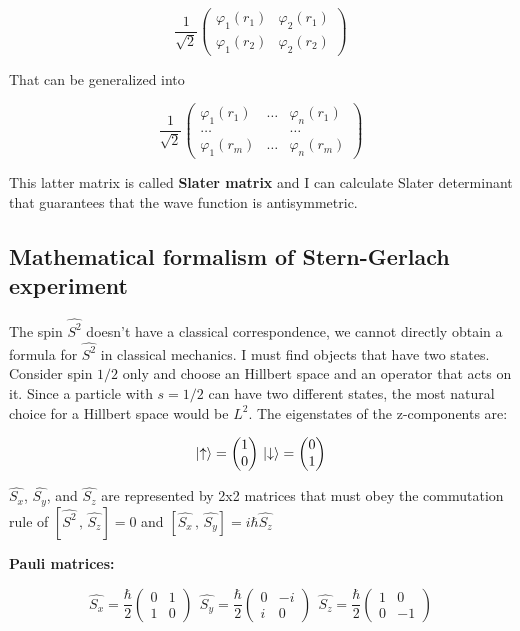 	$$\frac{1}{\sqrt{2}}\begin{pmatrix}\varphi_1(r_1)&\varphi_2(r_1)\\\varphi_1(r_2)&\varphi_2(r_2)\end{pmatrix}$$

	That can be generalized into

 $$\frac{1}{\sqrt{2}}\begin{pmatrix} \varphi_1(r_1)&\dots&\varphi_n(r_1)\\\dots& &\dots\\ \varphi_1(r_m)&\dots&\varphi_n(r_m) \end{pmatrix}$$

	This latter matrix is called \textbf{Slater matrix} and I can calculate Slater determinant that guarantees that the wave function is antisymmetric.

	\subsection{Mathematical formalism of Stern-Gerlach experiment}
	The spin $\hat{S^2}$ doesn't have a classical correspondence, we cannot directly obtain a formula for $\hat{S^2}$ in classical mechanics.
I must find objects that have two states.
	Consider spin $1/2$ only and choose an Hillbert space and an operator that acts on it.
Since a particle with $s=1/2$ can have two different states, the most natural choice for a Hillbert space would be \emph{$L^2$}.
	The eigenstates of the z-components are:

	$$\ket{\uparrow}=\begin{pmatrix}1\\0\end{pmatrix}\, \ket{\downarrow}=\begin{pmatrix}0\\1\end{pmatrix}$$

	$\hat{S_x}$, $\hat{S_y}$, and $\hat{S_z}$ are represented by 2x2 matrices that must obey the commutation rule of $[\hat{S^2}\,,\,\hat{S_z}]=0$ and $[\hat{S_x}\,,\,\hat{S_y}]=i\hbar\hat{S_z}$

	\textbf{Pauli matrices:}

	$$\hat{S_x}=\frac{\hbar}{2}\begin{pmatrix}0&1\\1&0\end{pmatrix}\;\,\hat{S_y}=\frac{\hbar}{2}\begin{pmatrix}0&-i\\i&0\end{pmatrix}\;\,	\hat{S_z}=\frac{\hbar}{2}\begin{pmatrix}1&0\\0&-1\end{pmatrix}$$

